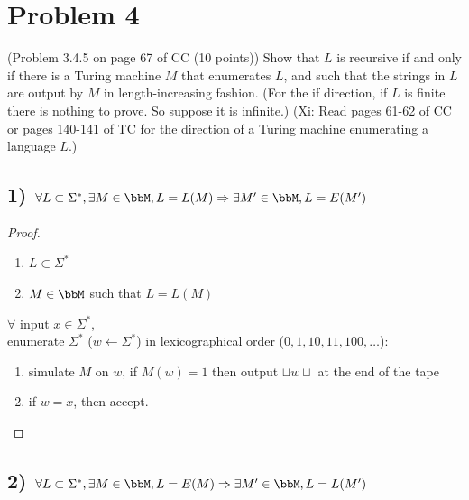 \documentclass[twoside,11pt]{homework}
\begin{document}
  



\section*{Problem 4}
(Problem 3.4.5 on page 67 of CC (10 points))
Show that $L$ is recursive if and only if there is a Turing machine $M$ that
enumerates $L$, and such that the strings in $L$ are output by $M$ in
length-increasing fashion.
(For the if direction, if $L$ is finite there is nothing to prove.
So suppose it is infinite.)
(Xi: Read pages 61-62 of CC or pages 140-141 of TC for the direction of a Turing
machine enumerating a language $L$.)

\subsection*{1) $ \forall L \subset \Sigma^*, \exists M \in \bbM, L = L(M) \Rightarrow \exists M' \in \bbM, L = E(M')$}

\begin{proof}
  \begin{given}
    \begin{enumerate}
    \item $L \subset \Sigma^*$
    \item $M \in \bbM$ such that $L = L(M)$
    \end{enumerate}
  \end{given}

  \begin{construct}
    $\forall \text{ input } x \in \Sigma^*$, \\
    enumerate $\Sigma^*$ ($w \leftarrow \Sigma^*$) in lexicographical order ($0, 1, 10, 11, 100, \dots$):
    \begin{enumerate}
    \item simulate $M$ on $w$, if $M(w) = 1$ then output $\sqcup w \sqcup$ at the end of
      the tape
    \item if $w = x$, then accept.
    \end{enumerate}
    
  \end{construct}
\end{proof}

\subsection*{2) $\forall L \subset \Sigma^*, \exists M \in \bbM, L = E(M) \Rightarrow \exists M' \in \bbM, L = L(M')$}
\end{document}
